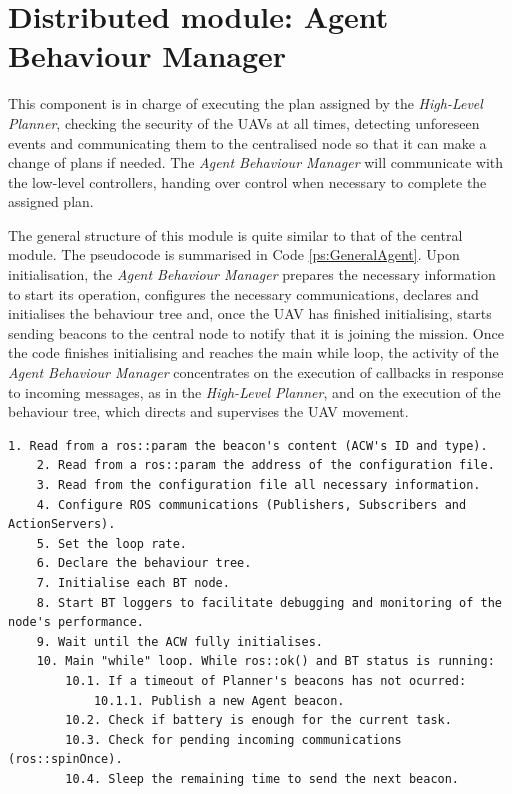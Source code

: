 \documentclass[fontsize=11pt, English=false, Español=true, Myfinal=true, twoside, numbers=noenddot]{scrbook}
\begin{document}
\section{Distributed module: Agent Behaviour Manager}
\label{sec:Distributed module: behaviour manager}
This component is in charge of executing the plan assigned by the \emph{High-Level Planner}, checking the security of the \glspl{UAV} at all times, detecting unforeseen events and communicating them to the centralised node so that it can make a change of plans if needed. The \emph{Agent Behaviour Manager} will communicate with the low-level controllers, handing over control when necessary to complete the assigned plan.

The general structure of this module is quite similar to that of the central module. The pseudocode is summarised in Code \ref{ps:GeneralAgent}. Upon initialisation, the \emph{Agent Behaviour Manager} prepares the necessary information to start its operation, configures the necessary communications, declares and initialises the behaviour tree and, once the \gls{UAV} has finished initialising, starts sending beacons to the central node to notify that it is joining the mission. Once the code finishes initialising and reaches the main while loop, the activity of the \emph{Agent Behaviour Manager} concentrates on the execution of callbacks in response to incoming messages, as in the \emph{High-Level Planner}, and on the execution of the behaviour tree, which directs and supervises the \gls{UAV} movement.

\begin{lstlisting}[caption={General operation of \emph{Agent Behaviour Manager}}, breaklines=true, label=ps:GeneralAgent]
	1. Read from a ros::param the beacon's content (ACW's ID and type).
	2. Read from a ros::param the address of the configuration file.
	3. Read from the configuration file all necessary information.
	4. Configure ROS communications (Publishers, Subscribers and ActionServers).
	5. Set the loop rate.
	6. Declare the behaviour tree.
	7. Initialise each BT node.
	8. Start BT loggers to facilitate debugging and monitoring of the node's performance.
	9. Wait until the ACW fully initialises.
	10. Main "while" loop. While ros::ok() and BT status is running:
		10.1. If a timeout of Planner's beacons has not ocurred:
			10.1.1. Publish a new Agent beacon.
		10.2. Check if battery is enough for the current task.
		10.3. Check for pending incoming communications (ros::spinOnce).
		10.4. Sleep the remaining time to send the next beacon.
\end{lstlisting}
\end{document}
